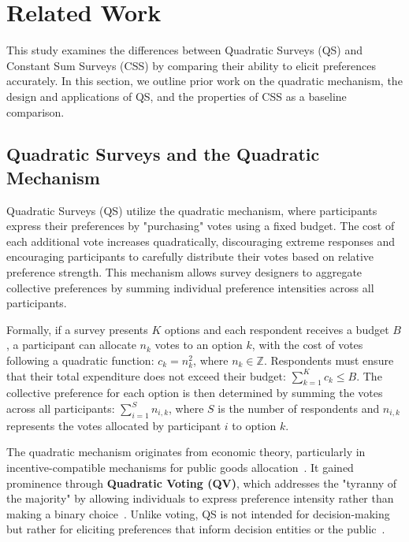 \section{Related Work}
\label{sec:relatedWorks}

This study examines the differences between Quadratic Surveys (QS) and Constant Sum Surveys (CSS) by comparing their ability to elicit preferences accurately. In this section, we outline prior work on the quadratic mechanism, the design and applications of QS, and the properties of CSS as a baseline comparison.

\subsection{Quadratic Surveys and the Quadratic Mechanism}
Quadratic Surveys (QS) utilize the quadratic mechanism, where participants express their preferences by "purchasing" votes using a fixed budget. The cost of each additional vote increases quadratically, discouraging extreme responses and encouraging participants to carefully distribute their votes based on relative preference strength. This mechanism allows survey designers to aggregate collective preferences by summing individual preference intensities across all participants.

Formally, if a survey presents $K$ options and each respondent receives a budget $B$, a participant can allocate $n_k$ votes to an option $k$, with the cost of votes following a quadratic function: $c_k = n_k^2$, where $n_k \in \mathbb{Z}$. Respondents must ensure that their total expenditure does not exceed their budget: $\sum_{k=1}^{K} c_k \leq B$. The collective preference for each option is then determined by summing the votes across all participants: $\sum_{i=1}^{S} n_{i,k}$, where $S$ is the number of respondents and $n_{i,k}$ represents the votes allocated by participant $i$ to option $k$.

The quadratic mechanism originates from economic theory, particularly in incentive-compatible mechanisms for public goods allocation~\cite{grovesOptimalAllocationPublic1977}. It gained prominence through \textbf{Quadratic Voting (QV)}, which addresses the "tyranny of the majority" by allowing individuals to express preference intensity rather than making a binary choice~\cite{posner2018radical}. Unlike voting, QS is not intended for decision-making but rather for eliciting preferences that inform decision entities or the public~\cite{chi}.

